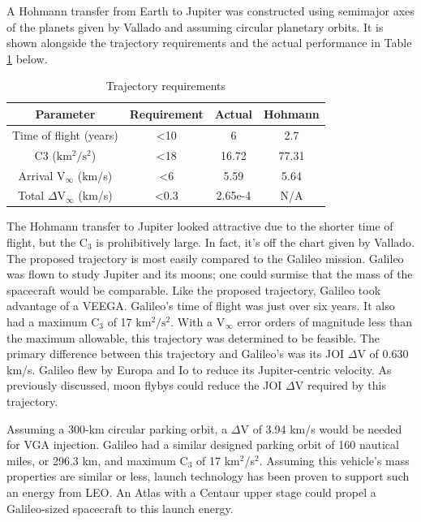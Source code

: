 \documentclass[]{aiaa-tc}%
\begin{document}
A Hohmann transfer from Earth to Jupiter was constructed using semimajor axes of the planets given by Vallado\cite{Vallado} and assuming circular planetary orbits. It is shown alongside the trajectory requirements and the actual performance in Table \ref{TrajReqs} below. 
\begin{table}[H]
\centering
\caption{Trajectory requirements}
\label{TrajReqs}
\begin{tabular}{|c|c|c|c|}
\hline
\rowcolor[HTML]{C0C0C0} 
\textbf{Parameter}     & \textbf{Requirement} & \textbf{Actual}& \textbf{Hohmann} \\ \hline
Time of flight (years) & \textless10          & 6       & 2.7        \\ \hline
C3 ($\mathrm{km^2/s^2}$)              & \textless18          & 16.72     & 77.31      \\ \hline
Arrival V$_\infty$ (km/s)       & \textless6           & 5.59       & 5.64     \\ \hline
Total $\Delta$V$_\infty$ (km/s)         & \textless0.3           & 2.65e-4    & N/A     \\ \hline
\end{tabular}
\end{table}
The Hohmann transfer to Jupiter looked attractive due to the shorter time of flight, but the C$_3$ is prohibitively large. In fact, it's off the chart given by Vallado\cite{Vallado}. The proposed trajectory is most easily compared to the Galileo mission. Galileo was flown to study Jupiter and its moons; one could surmise that the mass of the spacecraft would be comparable. Like the proposed trajectory, Galileo took advantage of a VEEGA. Galileo's time of flight was just over six years. It also had a maximum C$_3$ of 17 $\mathrm{km^2/s^2}$\cite{Damario}. With a V$_\infty$ error orders of magnitude less than the maximum allowable, this trajectory was determined to be feasible. The primary difference between this trajectory and Galileo's was its JOI $\Delta$V of 0.630 km/s.  Galileo flew by Europa and Io to reduce its Jupiter-centric velocity. As previously  discussed, moon flybys could reduce the JOI $\Delta$V required by this trajectory.
	
	\vspace{5 mm}

Assuming a 300-km circular parking orbit, a $\Delta$V of 3.94 km/s would be needed for VGA injection. Galileo had a similar designed parking orbit of 160 nautical miles, or 296.3 km, and maximum C$_3$ of 17 km$^2$/s$^2$\cite{Damario}. Assuming this vehicle's mass properties are similar or less, launch technology has been proven to support such an energy from LEO. An Atlas with a Centaur upper stage could propel a Galileo-sized spacecraft to this launch energy\cite{Vallado}.
\end{document}
